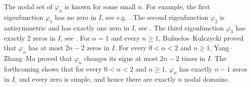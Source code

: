 \documentclass[11pt]{amsart}
\numberwithin{equation}{section}
\theoremstyle{remark}
\begin{document}
The nodal set of $\varphi_n$  is known for some small $n$. For example, the first eigenfunction $\varphi_1$ has no zero in $I$, see e.g. 
\cite{BanuelosKulczyckiMendezHernandez,ServadeiValdinociWeakViscosity,DelPezzoBonderLopez}.  The second eigenfunction $\varphi_2$ is antisymmetric and has exactly one zero in $I$, see \cite{BanuelosKulczyckiSteklov, KwasnickiInterval, DydaKuznetsovKwasnicki, FallFeulefackTemgouaWeth}. The third eigenfunction $\varphi_3$ has exactly 2 zeros in $I$, see \cite{BanuelosKulczyckiSteklov, FallWeth}. For  $\alpha=1$ and every $n\ge1$,
Ba\~nuelos--Kulczycki
\cite[Proposition~5.5]{BanuelosKulczyckiSteklov}
proved that $\varphi_n$ has at most $2n-2$ zeros in $I$. For every $0<\alpha<2$ and  $n\ge1$, Yang--Zhang--Ma \cite{yzm25} proved that $\varphi_n$ changes its signs at most $2n-2$ times in $I$.  The forthcoming    shows that for every $0<\alpha<2$ and $n\ge1$, $\varphi_n$ has exactly $n-1$ zeros in $I$, and every zero is simple, and hence there are exactly $n$ nodal domains.
\end{document}
